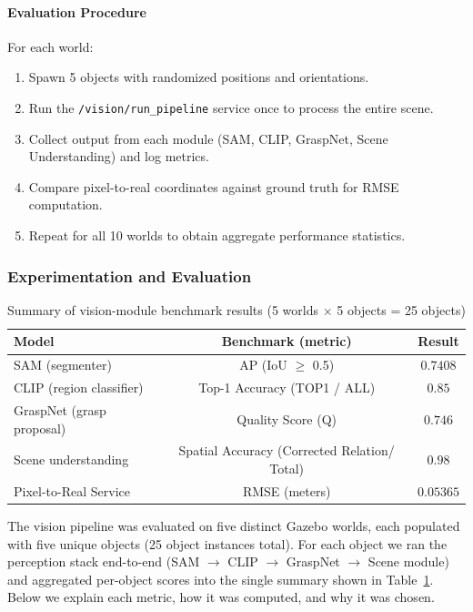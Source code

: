 \documentclass[12pt]{extarticle}
\begin{document}
\paragraph{Evaluation Procedure}
For each world:
\begin{enumerate}
    \item Spawn 5 objects with randomized positions and orientations.
    \item Run the \texttt{/vision/run\_pipeline} service once to process the entire scene.
    \item Collect output from each module (SAM, CLIP, GraspNet, Scene Understanding) and log metrics.
    \item Compare pixel-to-real coordinates against ground truth for RMSE computation.
    \item Repeat for all 10 worlds to obtain aggregate performance statistics.
\end{enumerate}

\subsubsection{Experimentation and Evaluation}

\begin{table}[h!]
\centering
\caption{Summary of vision-module benchmark results (5 worlds $\times$ 5 objects = 25 objects)}
\label{tab:vision-eval}
\begin{tabular}{lcc}
\hline
\textbf{Model} & \textbf{Benchmark (metric)} & \textbf{Result} \\
\hline
SAM (segmenter) & AP (IoU $\ge$ 0.5) & $0.7408$ \\
CLIP (region classifier) & Top-1 Accuracy (TOP1 / ALL) & $0.85$ \\
GraspNet (grasp proposal) & Quality Score (Q) & $0.746$ \\
Scene understanding & Spatial Accuracy (Corrected Relation/ Total) & $0.98$ \\
Pixel-to-Real Service & RMSE (meters) & $0.05365$ \\
\hline
\end{tabular}
\end{table}

The vision pipeline was evaluated on five distinct Gazebo worlds, each populated with five unique objects (25 object instances total). For each object we ran the perception stack end-to-end (SAM $\rightarrow$ CLIP $\rightarrow$ GraspNet $\rightarrow$ Scene module) and aggregated per-object scores into the single summary shown in Table~\ref{tab:vision-eval}. Below we explain each metric, how it was computed, and why it was chosen.
\end{document}

